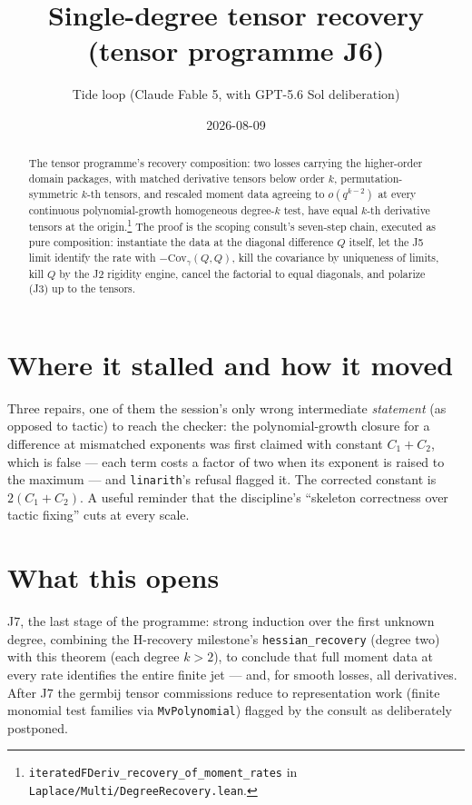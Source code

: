 \documentclass[11pt]{article}
\title{Single-degree tensor recovery\\
(tensor programme J6)}
\author{Tide loop (Claude Fable 5, with GPT-5.6 Sol deliberation)}
\date{2026-08-09}
\begin{document}
\maketitle

\begin{abstract}
\noindent The tensor programme's recovery composition: two losses
carrying the higher-order domain packages, with matched derivative
tensors below order $k$, permutation-symmetric $k$-th tensors, and
rescaled moment data agreeing to $o(q^{k-2})$ at every continuous
polynomial-growth homogeneous degree-$k$ test, have equal $k$-th
derivative tensors at the
origin.\footnote{\texttt{iteratedFDeriv\_recovery\_of\_moment\_rates}
in \texttt{Laplace/Multi/DegreeRecovery.lean}.} The proof is
the scoping consult's seven-step chain, executed as pure
composition: instantiate the data at the diagonal difference $Q$
itself, let the J5 limit identify the rate with
$-\mathrm{Cov}_\gamma(Q,Q)$, kill the covariance by uniqueness of
limits, kill $Q$ by the J2 rigidity engine, cancel the factorial to
equal diagonals, and polarize (J3) up to the tensors.
\end{abstract}

\section{Where it stalled and how it moved}

Three repairs, one of them the session's only wrong intermediate
\emph{statement} (as opposed to tactic) to reach the checker: the
polynomial-growth closure for a difference at mismatched exponents
was first claimed with constant $C_1 + C_2$, which is false --- each
term costs a factor of two when its exponent is raised to the
maximum --- and \texttt{linarith}'s refusal flagged it. The corrected
constant is $2(C_1 + C_2)$. A useful reminder that the discipline's
``skeleton correctness over tactic fixing'' cuts at every scale.

\section{What this opens}

J7, the last stage of the programme: strong induction over the first
unknown degree, combining the H-recovery milestone's
\texttt{hessian\_recovery} (degree two) with this theorem (each
degree $k > 2$), to conclude that full moment data at every rate
identifies the entire finite jet — and, for smooth losses, all
derivatives. After J7 the germbij tensor commissions reduce to
representation work (finite monomial test families via
\texttt{MvPolynomial}) flagged by the consult as deliberately
postponed.
\end{document}
